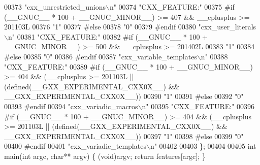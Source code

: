 \begin{DoxyCode}
00373 \textcolor{stringliteral}{"cxx\_unrestricted\_unions\(\backslash\)n"}
00374 \textcolor{stringliteral}{"CXX\_FEATURE:"}
00375 \textcolor{preprocessor}{#if (\_\_GNUC\_\_ * 100 + \_\_GNUC\_MINOR\_\_) >= 407 && \_\_cplusplus >= 201103L}
00376 \textcolor{stringliteral}{"1"}
00377 \textcolor{preprocessor}{#else}
00378 \textcolor{stringliteral}{"0"}
00379 \textcolor{preprocessor}{#endif}
00380 \textcolor{stringliteral}{"cxx\_user\_literals\(\backslash\)n"}
00381 \textcolor{stringliteral}{"CXX\_FEATURE:"}
00382 \textcolor{preprocessor}{#if (\_\_GNUC\_\_ * 100 + \_\_GNUC\_MINOR\_\_) >= 500 && \_\_cplusplus >= 201402L}
00383 \textcolor{stringliteral}{"1"}
00384 \textcolor{preprocessor}{#else}
00385 \textcolor{stringliteral}{"0"}
00386 \textcolor{preprocessor}{#endif}
00387 \textcolor{stringliteral}{"cxx\_variable\_templates\(\backslash\)n"}
00388 \textcolor{stringliteral}{"CXX\_FEATURE:"}
00389 \textcolor{preprocessor}{#if (\_\_GNUC\_\_ * 100 + \_\_GNUC\_MINOR\_\_) >= 404 && (\_\_cplusplus >= 201103L ||
       (defined(\_\_GXX\_EXPERIMENTAL\_CXX0X\_\_) && \_\_GXX\_EXPERIMENTAL\_CXX0X\_\_))}
00390 \textcolor{stringliteral}{"1"}
00391 \textcolor{preprocessor}{#else}
00392 \textcolor{stringliteral}{"0"}
00393 \textcolor{preprocessor}{#endif}
00394 \textcolor{stringliteral}{"cxx\_variadic\_macros\(\backslash\)n"}
00395 \textcolor{stringliteral}{"CXX\_FEATURE:"}
00396 \textcolor{preprocessor}{#if (\_\_GNUC\_\_ * 100 + \_\_GNUC\_MINOR\_\_) >= 404 && (\_\_cplusplus >= 201103L ||
       (defined(\_\_GXX\_EXPERIMENTAL\_CXX0X\_\_) && \_\_GXX\_EXPERIMENTAL\_CXX0X\_\_))}
00397 \textcolor{stringliteral}{"1"}
00398 \textcolor{preprocessor}{#else}
00399 \textcolor{stringliteral}{"0"}
00400 \textcolor{preprocessor}{#endif}
00401 \textcolor{stringliteral}{"cxx\_variadic\_templates\(\backslash\)n"}
00402 
00403 \};
00404 
00405 \textcolor{keywordtype}{int} main(\textcolor{keywordtype}{int} argc, \textcolor{keywordtype}{char}** argv) \{ (void)argv; \textcolor{keywordflow}{return} features[argc]; \}
\end{DoxyCode}
